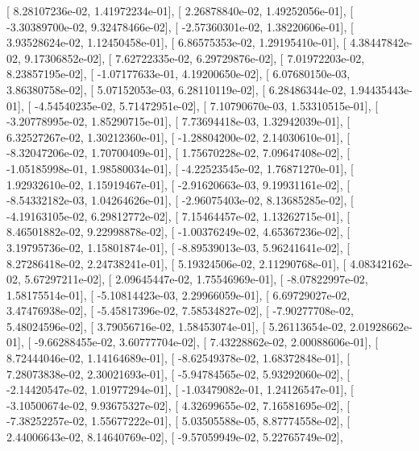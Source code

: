\documentclass{article}
\begin{document}
       [  8.28107236e-02,   1.41972234e-01],
       [  2.26878840e-02,   1.49252056e-01],
       [ -3.30389700e-02,   9.32478466e-02],
       [ -2.57360301e-02,   1.38220606e-01],
       [  3.93528624e-02,   1.12450458e-01],
       [  6.86575353e-02,   1.29195410e-01],
       [  4.38447842e-02,   9.17306852e-02],
       [  7.62722335e-02,   6.29729876e-02],
       [  7.01972203e-02,   8.23857195e-02],
       [ -1.07177633e-01,   4.19200650e-02],
       [  6.07680150e-03,   3.86380758e-02],
       [  5.07152053e-03,   6.28110119e-02],
       [  6.28486344e-02,   1.94435443e-01],
       [ -4.54540235e-02,   5.71472951e-02],
       [  7.10790670e-03,   1.53310515e-01],
       [ -3.20778995e-02,   1.85290715e-01],
       [  7.73694418e-03,   1.32942039e-01],
       [  6.32527267e-02,   1.30212360e-01],
       [ -1.28804200e-02,   2.14030610e-01],
       [ -8.32047206e-02,   1.70700409e-01],
       [  1.75670228e-02,   7.09647408e-02],
       [ -1.05185998e-01,   1.98580034e-01],
       [ -4.22523545e-02,   1.76871270e-01],
       [  1.92932610e-02,   1.15919467e-01],
       [ -2.91620663e-03,   9.19931161e-02],
       [ -8.54332182e-03,   1.04264626e-01],
       [ -2.96075403e-02,   8.13685285e-02],
       [ -4.19163105e-02,   6.29812772e-02],
       [  7.15464457e-02,   1.13262715e-01],
       [  8.46501882e-02,   9.22998878e-02],
       [ -1.00376249e-02,   4.65367236e-02],
       [  3.19795736e-02,   1.15801874e-01],
       [ -8.89539013e-03,   5.96241641e-02],
       [  8.27286418e-02,   2.24738241e-01],
       [  5.19324506e-02,   2.11290768e-01],
       [  4.08342162e-02,   5.67297211e-02],
       [  2.09645447e-02,   1.75546969e-01],
       [ -8.07822997e-02,   1.58175514e-01],
       [ -5.10814423e-03,   2.29966059e-01],
       [  6.69729027e-02,   3.47476938e-02],
       [ -5.45817396e-02,   7.58534827e-02],
       [ -7.90277708e-02,   5.48024596e-02],
       [  3.79056716e-02,   1.58453074e-01],
       [  5.26113654e-02,   2.01928662e-01],
       [ -9.66288455e-02,   3.60777704e-02],
       [  7.43228862e-02,   2.00088606e-01],
       [  8.72444046e-02,   1.14164689e-01],
       [ -8.62549378e-02,   1.68372848e-01],
       [  7.28073838e-02,   2.30021693e-01],
       [ -5.94784565e-02,   5.93292060e-02],
       [ -2.14420547e-02,   1.01977294e-01],
       [ -1.03479082e-01,   1.24126547e-01],
       [ -3.10500674e-02,   9.93675327e-02],
       [  4.32699655e-02,   7.16581695e-02],
       [ -7.38252257e-02,   1.55677222e-01],
       [  5.03505588e-05,   8.87774558e-02],
       [  2.44006643e-02,   8.14640769e-02],
       [ -9.57059949e-02,   5.22765749e-02],
\end{document}
